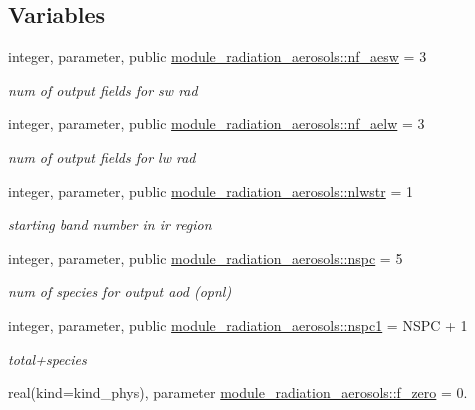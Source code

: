 \subsection*{Variables}
\begin{DoxyCompactItemize}
\item 
integer, parameter, public \hyperlink{group__module__radiation__aerosols_gae0d9615fa694e2a5dfe8fb48e99b7e76}{module\+\_\+radiation\+\_\+aerosols\+::nf\+\_\+aesw} = 3
\begin{DoxyCompactList}\small\item\em num of output fields for sw rad \end{DoxyCompactList}\item 
integer, parameter, public \hyperlink{group__module__radiation__aerosols_gafba0069cd611248a9595a126a13f5203}{module\+\_\+radiation\+\_\+aerosols\+::nf\+\_\+aelw} = 3
\begin{DoxyCompactList}\small\item\em num of output fields for lw rad \end{DoxyCompactList}\item 
integer, parameter, public \hyperlink{group__module__radiation__aerosols_ga654ab60d433133542d3c07edd2244566}{module\+\_\+radiation\+\_\+aerosols\+::nlwstr} = 1
\begin{DoxyCompactList}\small\item\em starting band number in ir region \end{DoxyCompactList}\item 
integer, parameter, public \hyperlink{group__module__radiation__aerosols_ga3d126c465af80bb698d9d1a288c181bb}{module\+\_\+radiation\+\_\+aerosols\+::nspc} = 5
\begin{DoxyCompactList}\small\item\em num of species for output aod (opnl) \end{DoxyCompactList}\item 
integer, parameter, public \hyperlink{group__module__radiation__aerosols_ga476c0181513603112dec3f4d2a2ec839}{module\+\_\+radiation\+\_\+aerosols\+::nspc1} = N\+S\+PC + 1
\begin{DoxyCompactList}\small\item\em total+species \end{DoxyCompactList}\item 
real(kind=kind\+\_\+phys), parameter \hyperlink{group__module__radiation__aerosols_ga7db1adcf476a9a5532230aa11fcc3bb7}{module\+\_\+radiation\+\_\+aerosols\+::f\+\_\+zero} = 0.
\item 

\end{DoxyCompactItemize}
